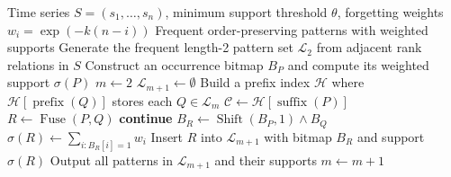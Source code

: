 
\begin{algorithm}[t]
\caption{FastOPF-BM: Bitmap-based order-preserving fusion}
\label{alg:fastopf-bm}
\begin{algorithmic}[1]
\Require Time series $S=(s_1,\ldots,s_n)$, minimum support threshold $\theta$, forgetting weights $w_i=\exp(-k(n-i))$
\Ensure Frequent order-preserving patterns with weighted supports
\State Generate the frequent length-2 pattern set $\mathcal{L}_2$ from adjacent rank relations in $S$
    \State Construct an occurrence bitmap $B_P$ and compute its weighted support $\sigma(P)$
\EndFor
\State $m \gets 2$
    \State $\mathcal{L}_{m+1} \gets \emptyset$
    \State Build a prefix index $\mathcal{H}$ where $\mathcal{H}[\operatorname{prefix}(Q)]$ stores each $Q \in \mathcal{L}_m$
        \State $\mathcal{C} \gets \mathcal{H}[\operatorname{suffix}(P)]$
            \State $R \gets \operatorname{Fuse}(P,Q)$
                \State \textbf{continue}
            \EndIf
            \State $B_R \gets \operatorname{Shift}(B_P,1) \wedge B_Q$
            \State $\sigma(R) \gets \sum_{i:B_R[i]=1} w_i$
                \State Insert $R$ into $\mathcal{L}_{m+1}$ with bitmap $B_R$ and support $\sigma(R)$
            \EndIf
        \EndFor
    \EndFor
    \State Output all patterns in $\mathcal{L}_{m+1}$ and their supports
    \State $m \gets m+1$
\EndWhile
\end{algorithmic}
\end{algorithm}

